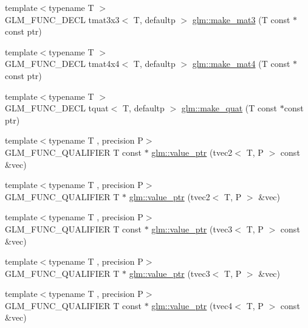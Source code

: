\begin{DoxyCompactItemize}
{\footnotesize template$<$typename T $>$ }\\G\+L\+M\+\_\+\+F\+U\+N\+C\+\_\+\+D\+E\+C\+L tmat3x3$<$ T, defaultp $>$ \hyperlink{group__gtc__type__ptr_gac2bc10c519ffc8db9e24f325f23787ea}{glm\+::make\+\_\+mat3} (T const $\ast$const ptr)
\item 
{\footnotesize template$<$typename T $>$ }\\G\+L\+M\+\_\+\+F\+U\+N\+C\+\_\+\+D\+E\+C\+L tmat4x4$<$ T, defaultp $>$ \hyperlink{group__gtc__type__ptr_ga2c6e6d457cb932e1ce683e4f690a6f60}{glm\+::make\+\_\+mat4} (T const $\ast$const ptr)
\item 
{\footnotesize template$<$typename T $>$ }\\G\+L\+M\+\_\+\+F\+U\+N\+C\+\_\+\+D\+E\+C\+L tquat$<$ T, defaultp $>$ \hyperlink{group__gtc__type__ptr_gaadafb6600af2633e4c98cc64c72f5269}{glm\+::make\+\_\+quat} (T const $\ast$const ptr)
\item 
{\footnotesize template$<$typename T , precision P$>$ }\\G\+L\+M\+\_\+\+F\+U\+N\+C\+\_\+\+Q\+U\+A\+L\+I\+F\+I\+E\+R T const $\ast$ \hyperlink{group__gtc__type__ptr_gafb01331238d8899dde700cb9b5dc6ef3}{glm\+::value\+\_\+ptr} (tvec2$<$ T, P $>$ const \&vec)
\item 
{\footnotesize template$<$typename T , precision P$>$ }\\G\+L\+M\+\_\+\+F\+U\+N\+C\+\_\+\+Q\+U\+A\+L\+I\+F\+I\+E\+R T $\ast$ \hyperlink{group__gtc__type__ptr_gabd3cc713184a2093862605f5f0abb8a4}{glm\+::value\+\_\+ptr} (tvec2$<$ T, P $>$ \&vec)
\item 
{\footnotesize template$<$typename T , precision P$>$ }\\G\+L\+M\+\_\+\+F\+U\+N\+C\+\_\+\+Q\+U\+A\+L\+I\+F\+I\+E\+R T const $\ast$ \hyperlink{group__gtc__type__ptr_gac04db5d9c05bd3d50140f34f8695a08c}{glm\+::value\+\_\+ptr} (tvec3$<$ T, P $>$ const \&vec)
\item 
{\footnotesize template$<$typename T , precision P$>$ }\\G\+L\+M\+\_\+\+F\+U\+N\+C\+\_\+\+Q\+U\+A\+L\+I\+F\+I\+E\+R T $\ast$ \hyperlink{group__gtc__type__ptr_gab2832ef9f1d2571fab5c7ae661e11e75}{glm\+::value\+\_\+ptr} (tvec3$<$ T, P $>$ \&vec)
\item 
{\footnotesize template$<$typename T , precision P$>$ }\\G\+L\+M\+\_\+\+F\+U\+N\+C\+\_\+\+Q\+U\+A\+L\+I\+F\+I\+E\+R T const $\ast$ \hyperlink{group__gtc__type__ptr_gaf641bc0e28d4b274826b9afed315d310}{glm\+::value\+\_\+ptr} (tvec4$<$ T, P $>$ const \&vec)
\item 

\end{DoxyCompactItemize}
